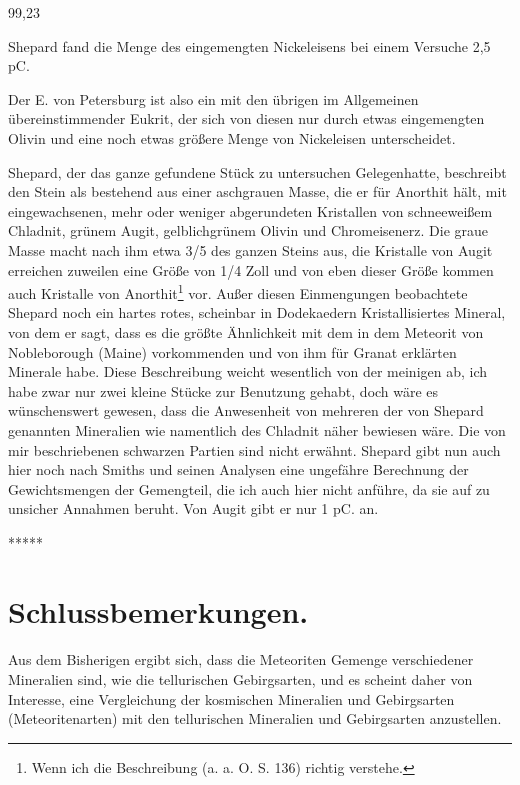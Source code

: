 \documentclass[a4paper, 11pt, oneside]{article}
\begin{document}
99,23  

Shepard fand die Menge des eingemengten Nickeleisens bei einem Versuche 2,5 pC.

Der E. von Petersburg ist also ein mit den übrigen im Allgemeinen übereinstimmender Eukrit, der sich von diesen nur durch etwas eingemengten Olivin und eine noch etwas größere Menge von Nickeleisen unterscheidet.

Shepard, der das ganze gefundene Stück zu untersuchen Gelegenhatte, beschreibt den Stein als bestehend aus einer aschgrauen Masse, die er für Anorthit hält, mit eingewachsenen, mehr oder weniger abgerundeten Kristallen von schneeweißem Chladnit, grünem Augit, gelblichgrünem Olivin und Chromeisenerz. Die graue Masse macht nach ihm etwa 3/5 des ganzen Steins aus, die Kristalle von Augit erreichen zuweilen eine Größe von 1/4 Zoll und von eben dieser Größe kommen auch Kristalle von Anorthit\footnote{Wenn ich die Beschreibung (a. a. O. S. 136) richtig verstehe.} vor. Außer diesen Einmengungen beobachtete Shepard noch ein hartes rotes, scheinbar in Dodekaedern Kristallisiertes Mineral, von dem er sagt, dass es die größte Ähnlichkeit mit dem in dem Meteorit von Nobleborough (Maine) vorkommenden und von ihm für Granat erklärten Minerale habe. Diese Beschreibung weicht wesentlich von der meinigen ab, ich habe zwar nur zwei kleine Stücke zur Benutzung gehabt, doch wäre es wünschenswert gewesen, dass die Anwesenheit von mehreren der von Shepard genannten Mineralien wie namentlich des Chladnit näher bewiesen wäre. Die von mir beschriebenen schwarzen Partien sind nicht erwähnt. Shepard gibt nun auch hier noch nach Smiths und seinen Analysen eine ungefähre Berechnung der Gewichtsmengen der Gemengteil, die ich auch hier nicht anführe, da sie auf zu unsicher Annahmen beruht. Von Augit gibt er nur 1 pC. an.

\centerline{*\hspace{15mm}*\hspace{15mm}*\hspace{15mm}*\hspace{15mm}*}
\clearpage
\section{Schlussbemerkungen.}
\paragraph{}
Aus dem Bisherigen ergibt sich, dass die Meteoriten Gemenge verschiedener Mineralien sind, wie die tellurischen Gebirgsarten, und es scheint daher von Interesse, eine Vergleichung der kosmischen Mineralien und Gebirgsarten (Meteoritenarten) mit den tellurischen Mineralien und Gebirgsarten anzustellen.
\end{document}
